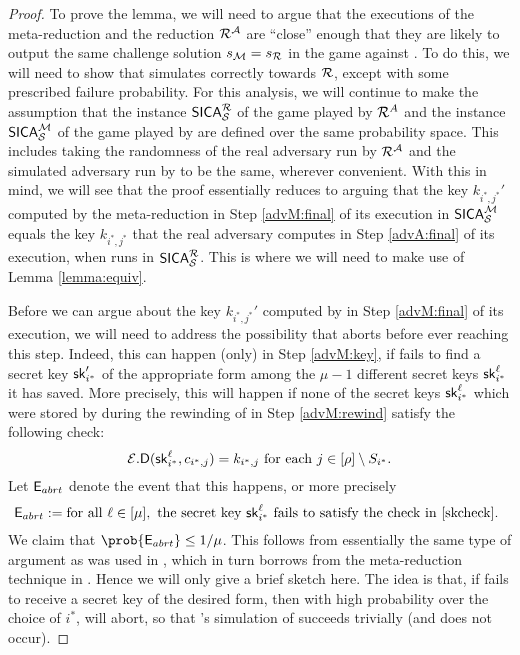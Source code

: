 \begin{proof}
  To prove the lemma,
  we will need to argue that the executions of the meta-reduction \redM
  and the reduction \(\redR^{\advA}\) are ``close'' enough
  that they are likely to output the same challenge solution \(s_{\redM} = s_{\redR}\)
  in the \SICA game against \Simple.
  To do this, we will need to show that \redM simulates \advA
  correctly towards \(\redR\), except with some prescribed failure probability.
  For this analysis, we will continue to make the assumption that
  the instance \(\SICA_{\Simple}^{\redR}\) of the \SICA game played by \(\redR^{A}\)
  and the instance \(\mathsf{SICA}_{\mathcal{S}}^{\mathcal{M}}\) of the \SICA game played by \redM
  are defined over the same probability space.
  This includes taking the randomness of the real adversary
  \advA run by \(\redR^{\advA}\)
  and the simulated adversary run by \redM to be the same,
  wherever convenient.
  With this in mind, we will see that
  the proof essentially reduces to arguing that
  the key \(k_{i^{*},j^{*}}'\) computed by the meta-reduction
  \redM in Step \ref{advM:final} of its execution in \(\mathsf{SICA}_{\mathcal{S}}^{\mathcal{M}}\)
  equals the key \(k_{i^{*},j^{*}}\)
  that the real adversary \advA computes in Step \ref{advA:final} of its execution,
  when \redR runs \advA in \(\SICA_{\Simple}^{\redR}\).
  This is where we will need to make use of Lemma \ref{lemma:equiv}.

  Before we can argue about the key \(k_{i^{*},j^{*}}'\) computed by
  \redM in Step \ref{advM:final} of its execution,
  we will need to address the possibility that \redM aborts
  before ever reaching this step.
  Indeed, this can happen (only) in Step \ref{advM:key},
  if \redM fails to find a secret key \(\mathsf{sk}_{i^{*}}'\)
  of the appropriate form among the \(\mu - 1\)
  different secret keys \(\mathsf{sk}_{i^{*}}^{\ell}\) it has saved.
  More precisely, this will happen if
  none of the secret keys \(\mathsf{sk}_{i^{*}}^{\ell}\)
  which were stored by \redM during the rewinding of \redR in Step \ref{advM:rewind}
  satisfy the following check:
  \begin{equation}\label{skcheck}
  \mathcal{E}.\mathsf{D}(\mathsf{sk}_{i^{*}}^{\ell},c_{i^{*},j}) = k_{i^{*},j}
  \text{ for each } j \in [\rho] \setminus S_{i^{*}}.
  \end{equation}
  Let \(\mathsf{E}_{abrt}\) denote the event that this happens, or more precisely
  \[
    \mathsf{E}_{abrt} := \text{for all } \ell \in [\mu],
    \text{ the secret key } \mathsf{sk}_{i^{*}}^{\ell}
    \text{ fails to satisfy the check in \eqref{skcheck}. }
  \]
  We claim that \(\prob{\eventE_{abrt}} \le 1/\mu\).
  This follows from essentially the same type of argument as was used
  in , which in turn borrows from the
  meta-reduction technique in \cite{EC:BJLS16}.
  Hence we will only give a brief sketch here.
  The idea is that, if \redM fails to receive a secret key of the desired form,
  then with high probability over the choice of \(i^{*}\), \advA{} will abort,
  so that \redM's simulation of \advA succeeds trivially (and  does not occur).


\end{proof}
